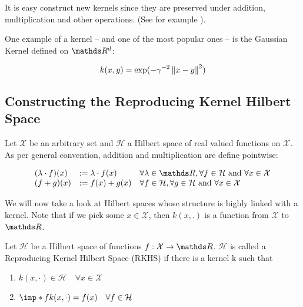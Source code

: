 It is easy construct new kernels since they are preserved under addition, multiplication and other operations. 
(See for example \cite{GrettonNotes}).

One example of a kernel -- and one of the most popular ones -- is the Gaussian Kernel defined on $\R^d$:

$$
    k(x, y) = \exp (-\gamma^{-2}\left\lVert x - y\right\rVert^2)
$$

\subsection{Constructing the Reproducing Kernel Hilbert Space}

Let $\mathcal{X}$ be an arbitrary set and $\mathcal{H}$ a Hilbert space of real valued functions
on $\mathcal{X}$. As per general convention, addition and multiplication are define pointwise:

\begin{equation}
    \begin{array}{lll}
    (\lambda \cdot f)(x) & :=\lambda \cdot f(x) & \forall \lambda \in \R, \forall f \in \mathcal{H} \text { and } \forall x \in \mathcal{X} \\
    (f+g)(x) & :=f(x)+g(x) & \forall f \in \mathcal{H}, \forall g \in \mathcal{H} \text { and } \forall x \in \mathcal{X}
    \end{array}
\end{equation}





We will now take a look at Hilbert spaces whose structure is highly linked with a kernel. 
Note that if we pick some $x \in \mathcal{X}$, then $k(x, .)$ is a function from $\mathcal{X}$ to $\R$.

\begin{definition}
    Let $\mathcal{H}$ be a Hilbert space of functions $f: \mathcal{X} \rightarrow \R$. 
    $\mathcal{H}$ is called a Reproducing Kernel Hilbert Space (RKHS) if there is a kernel k such that

    \begin{enumerate}
        \item $ k(x, \cdot) \in \mathcal{H} \quad \forall x \in \mathcal{X}$
        \item $ \inp*{f}{k(x, \cdot)} = f(x) \quad \forall f \in \mathcal{H}$
    \end{enumerate}

\end{definition}

